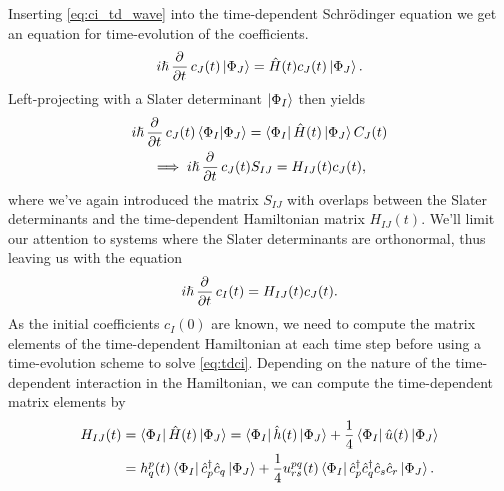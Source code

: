         Inserting \autoref{eq:ci_td_wave} into the time-dependent Schrödinger
        equation we get an equation for time-evolution of the coefficients.
        \begin{align}
            i\hslash \dpd[]{}{t}c_{J}(t)\ket{\Phi_J}
            = \hamil(t) c_{J}(t)\ket{\Phi_J}.
        \end{align}
        Left-projecting with a Slater determinant $\ket{\Phi_I}$ then yields
        \begin{gather}
            i\hslash \dpd[]{}{t}c_{J}(t)\braket{\Phi_I}{\Phi_J}
            = \bra{\Phi_I}\hamil(t)\ket{\Phi_J} C_{J}(t) \\
            \implies
            i\hslash \dpd[]{}{t}c_{J}(t) S_{IJ}
            = H_{IJ}(t) c_{J}(t),
        \end{gather}
        where we've again introduced the matrix $S_{IJ}$ with overlaps between
        the Slater determinants and the time-dependent Hamiltonian matrix
        $H_{IJ}(t)$.
        We'll limit our attention to systems where the Slater determinants are
        orthonormal, thus leaving us with the equation
        \begin{align}
            i\hslash \dpd[]{}{t}c_{I}(t)
            = H_{IJ}(t) c_{J}(t).
            \label{eq:tdci}
        \end{align}
        As the initial coefficients $c_{I}(0)$ are known, we need to compute the
        matrix elements of the time-dependent Hamiltonian at each time step
        before using a time-evolution scheme to solve \autoref{eq:tdci}.
        Depending on the nature of the time-dependent interaction in the
        Hamiltonian, we can compute the time-dependent matrix elements by
        \begin{align}
            H_{IJ}(t)
            &= \bra{\Phi_I}\hat{H}(t)\ket{\Phi_J}
            = \bra{\Phi_I}\hat{h}(t)\ket{\Phi_J}
            + \frac{1}{4}\bra{\Phi_I}\hat{u}(t)\ket{\Phi_J}
            \\
            &=
            h^{p}_{q}(t)
            \bra{\Phi_I}\hat{c}_{p}^{\dagger}\hat{c}_{q}\ket{\Phi_J}
            + \frac{1}{4}u^{pq}_{rs}(t)
            \bra{\Phi_I}\hat{c}_{p}^{\dagger}\hat{c}_{q}^{\dagger}\hat{c}_{s}\hat{c}_{r}\ket{\Phi_J}.
        \end{align}

